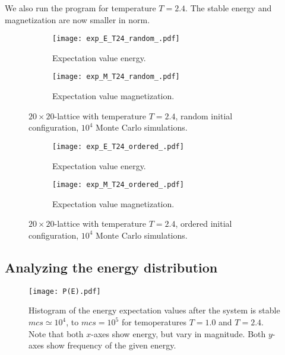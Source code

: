 \documentclass[11pt]{article}
\begin{document}
\begin{flushleft}
We also run the program for temperature $T=2.4$. The stable energy and magnetization are now smaller in norm. 

\begin{figure}[H]
\centering
\begin{subfigure}{.5\textwidth}
  \centering
  \texttt{[image: exp\_E\_T24\_random\_.pdf]}
  \caption{Expectation value energy.}
  \label{fig:sub1}
\end{subfigure}%
\begin{subfigure}{.5\textwidth}
  \centering
  \texttt{[image: exp\_M\_T24\_random\_.pdf]}
  \caption{Expectation value magnetization.}
  \label{fig:sub2}
\end{subfigure}
\caption{$20 \times 20$-lattice with temperature $T=2.4$, random initial configuration, $10^4$ Monte Carlo simulations.}
\label{fig:cms-EM T=2.4 random}
\end{figure}


\begin{figure}[H]
\centering
\begin{subfigure}{.5\textwidth}
  \centering
  \texttt{[image: exp\_E\_T24\_ordered\_.pdf]}
  \caption{Expectation value energy.}
  \label{fig:sub1}
\end{subfigure}%
\begin{subfigure}{.5\textwidth}
  \centering
  \texttt{[image: exp\_M\_T24\_ordered\_.pdf]}
  \caption{Expectation value magnetization.}
  \label{fig:sub2}
\end{subfigure}
\caption{$20 \times 20$-lattice with temperature $T=2.4$, ordered initial configuration, $10^4$ Monte Carlo simulations.}
\label{fig:cms-EM T=2.4 random}
\end{figure}
\end{flushleft}


\subsection*{Analyzing the energy distribution}

\begin{figure}[H]
\centering
\texttt{[image: P(E).pdf]}
\caption{Histogram of the energy expectation values after the system is stable $mcs \simeq 10^4$, to $mcs= 10^5$ for temoperatures $T=1.0$ and $T=2.4$. Note that both $x$-axes show energy, but vary in magnitude. Both $y$-axes show frequency of the given energy.}
\label{fig::P(E)}
\end{figure}
\end{document}
